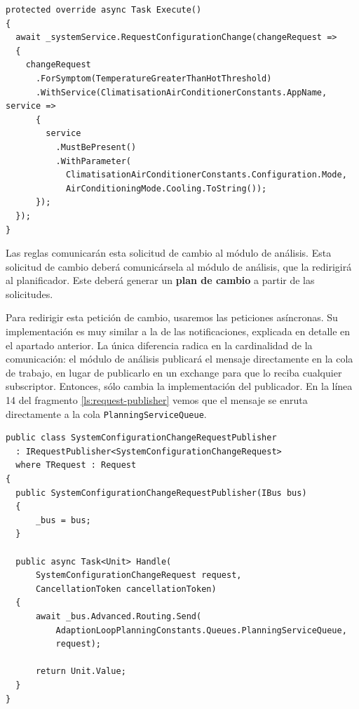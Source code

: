 \begin{lstlisting}[language={[Sharp]C},caption={Implementación de la misma petición siguiendo el patrón \emph{builder}.},captionpos=b, label=ls:change-request-builder]
protected override async Task Execute()
{
  await _systemService.RequestConfigurationChange(changeRequest =>
  {
    changeRequest
      .ForSymptom(TemperatureGreaterThanHotThreshold)
      .WithService(ClimatisationAirConditionerConstants.AppName, service =>
      {
        service
          .MustBePresent()
          .WithParameter(
            ClimatisationAirConditionerConstants.Configuration.Mode,
            AirConditioningMode.Cooling.ToString());
      });
  });
}
\end{lstlisting}

Las reglas comunicarán esta solicitud de cambio al módulo de análisis. Esta solicitud de cambio deberá comunicársela al módulo de análisis, que la redirigirá al planificador. Este deberá generar un \textbf{plan de cambio} a partir de las solicitudes.

Para redirigir esta petición de cambio, usaremos las peticiones asíncronas. Su implementación es muy similar a la de las notificaciones, explicada en detalle en el apartado anterior. La única diferencia radica en la cardinalidad de la comunicación: el módulo de análisis publicará el mensaje directamente en la cola de trabajo, en lugar de publicarlo en un exchange para que lo reciba cualquier subscriptor. Entonces, sólo cambia la implementación del publicador. En la línea 14 del fragmento \ref{ls:request-publisher} vemos que el mensaje se enruta directamente a la cola \texttt{PlanningServiceQueue}.

\begin{lstlisting}[language={[Sharp]C},caption={Para suscribirnos a los \foreign{english}{topics} de las notificaciones obtenemos las dependencias de las reglas mediante reflexión},captionpos=b, label=ls:request-publisher]
public class SystemConfigurationChangeRequestPublisher
  : IRequestPublisher<SystemConfigurationChangeRequest>
  where TRequest : Request
{
  public SystemConfigurationChangeRequestPublisher(IBus bus)
  {
      _bus = bus;
  }

  public async Task<Unit> Handle(
      SystemConfigurationChangeRequest request,
      CancellationToken cancellationToken)
  {
      await _bus.Advanced.Routing.Send(
          AdaptionLoopPlanningConstants.Queues.PlanningServiceQueue,
          request);

      return Unit.Value;
  }
}
  \end{lstlisting}


